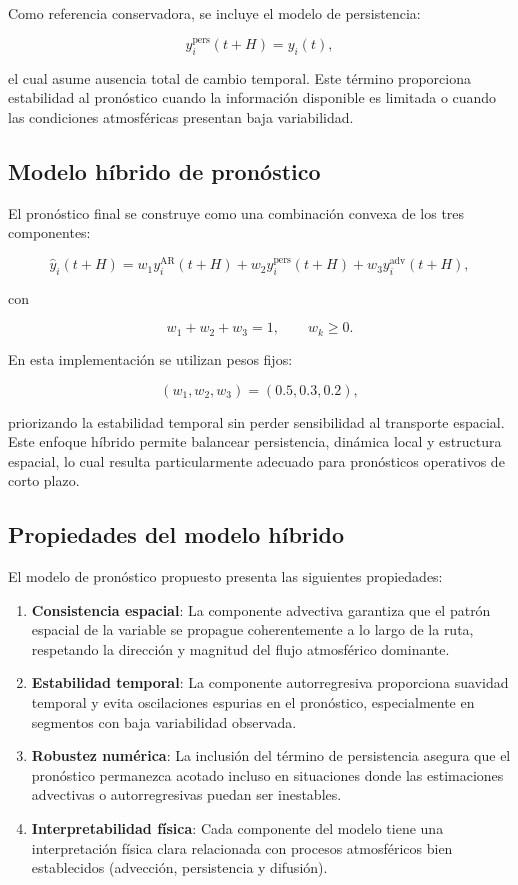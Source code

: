 \documentclass[
  spanish,
  us-letterpaper,
]{scrreprt}
\numberwithin{equation}{section}
\begin{document}
Como referencia conservadora, se incluye el modelo de persistencia:

\[
y_i^{\text{pers}}(t+H) = y_i(t),
\]

el cual asume ausencia total de cambio temporal. Este término
proporciona estabilidad al pronóstico cuando la información disponible
es limitada o cuando las condiciones atmosféricas presentan baja
variabilidad.

\subsection{Modelo híbrido de
pronóstico}\label{modelo-huxedbrido-de-pronuxf3stico}

El pronóstico final se construye como una combinación convexa de los
tres componentes:

\[
\hat{y}_i(t+H) = w_1 y_i^{\text{AR}}(t+H) + w_2 y_i^{\text{pers}}(t+H) + w_3 y_i^{\text{adv}}(t+H),
\]

con

\[
w_1 + w_2 + w_3 = 1, \qquad w_k \ge 0.
\]

En esta implementación se utilizan pesos fijos:

\[
(w_1, w_2, w_3) = (0.5, 0.3, 0.2),
\]

priorizando la estabilidad temporal sin perder sensibilidad al
transporte espacial. Este enfoque híbrido permite balancear
persistencia, dinámica local y estructura espacial, lo cual resulta
particularmente adecuado para pronósticos operativos de corto plazo.

\subsection{Propiedades del modelo
híbrido}\label{propiedades-del-modelo-huxedbrido}

El modelo de pronóstico propuesto presenta las siguientes propiedades:

\begin{enumerate}
\def\labelenumi{\arabic{enumi}.}
\item
  \textbf{Consistencia espacial}: La componente advectiva garantiza que
  el patrón espacial de la variable se propague coherentemente a lo
  largo de la ruta, respetando la dirección y magnitud del flujo
  atmosférico dominante.
\item
  \textbf{Estabilidad temporal}: La componente autorregresiva
  proporciona suavidad temporal y evita oscilaciones espurias en el
  pronóstico, especialmente en segmentos con baja variabilidad
  observada.
\item
  \textbf{Robustez numérica}: La inclusión del término de persistencia
  asegura que el pronóstico permanezca acotado incluso en situaciones
  donde las estimaciones advectivas o autorregresivas puedan ser
  inestables.
\item
  \textbf{Interpretabilidad física}: Cada componente del modelo tiene
  una interpretación física clara relacionada con procesos atmosféricos
  bien establecidos (advección, persistencia y difusión).
\end{enumerate}
\end{document}
